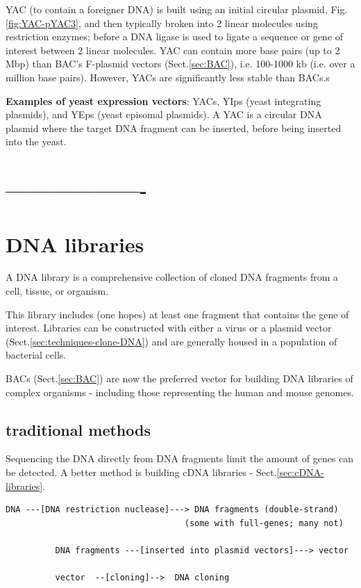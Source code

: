 YAC (to contain a foreigner DNA) is built using an initial circular plasmid,
Fig.\ref{fig:YAC-pYAC3}, and then typically broken into 2 linear molecules using
restriction enzymes; before a DNA ligase is used to ligate a sequence or gene of
interest between 2 linear molecules. YAC can contain more base pairs (up to
2 Mbp) than BAC's F-plasmid vectors (Sect.\ref{sec:BAC}), i.e.
100-1000 kb (i.e. over a million base pairs). However, YACs are significantly
less stable than BACs.s

{\bf Examples of yeast expression vectors}: YACs, YIps (yeast integrating
plasmids), and YEps (yeast episomal plasmids). A YAC is a circular DNA plasmid
where the target DNA fragment can be inserted, before being inserted into the
yeast.


 
 
\section{-------------------}
 
\section{DNA libraries}
\label{sec:DNA-libraries}

A DNA library is a comprehensive collection of cloned DNA fragments from a cell,
tissue, or organism. 

This library includes (one hopes) at least one fragment that contains the gene
of interest. Libraries can be constructed with either a virus or a plasmid
vector (Sect.\ref{sec:techniques-clone-DNA}) and are generally housed in a
population of bacterial cells. 

BACs (Sect.\ref{sec:BAC}) are now the preferred vector for building DNA
libraries of complex organisms - including those representing the human and
mouse genomes.

\subsection{traditional methods}

Sequencing the DNA directly from DNA fragments limit the amount of genes can be
detected. A better method is building cDNA libraries -
Sect.\ref{sec:cDNA-libraries}.
\begin{verbatim}
DNA ---[DNA restriction nuclease]---> DNA fragments (double-strand)
                                    (some with full-genes; many not)
                                    
          DNA fragments ---[inserted into plasmid vectors]---> vector
          
          vector  --[cloning]-->  DNA cloning
\end{verbatim}

